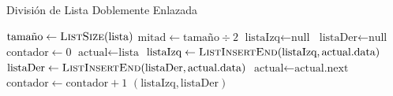\documentclass[11pt,a4paper]{article}
\begin{document}
\begin{algorithm}[H]
\caption{División de Lista Doblemente Enlazada}
\begin{algorithmic}[1]
    \State $\text{tamaño} \leftarrow \textsc{ListSize}(\text{lista})$
    \State $\text{mitad} \leftarrow \text{tamaño} \div 2$
    \State $\text{listaIzq} \leftarrow \text{null}$
    \State $\text{listaDer} \leftarrow \text{null}$
    \State $\text{contador} \leftarrow 0$
    \State $\text{actual} \leftarrow \text{lista}$
            \State $\text{listaIzq} \leftarrow \textsc{ListInsertEnd}(\text{listaIzq}, \text{actual.data})$
        \Else
            \State $\text{listaDer} \leftarrow \textsc{ListInsertEnd}(\text{listaDer}, \text{actual.data})$
        \EndIf
        \State $\text{actual} \leftarrow \text{actual.next}$
        \State $\text{contador} \leftarrow \text{contador} + 1$
    \EndWhile
    \State \Return $(\text{listaIzq}, \text{listaDer})$
\EndProcedure
\end{algorithmic}
\end{algorithm}
\end{document}
